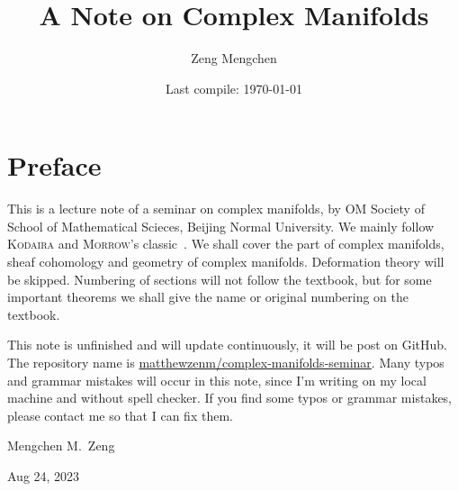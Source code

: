 \documentclass[a4paper]{book}
\title{A Note on Complex Manifolds}
\author{Zeng Mengchen}
\date{Last compile: \today}
\theoremstyle{definition}
\theoremstyle{plain}
\theoremstyle{remark}
\begin{document}
\maketitle
\thispagestyle{empty}

\frontmatter

\tableofcontents
\newpage
\thispagestyle{empty}

\chapter{Preface}

This is a lecture note of a seminar on complex manifolds, by OM Society of School of Mathematical Scieces, Beijing Normal University.
We mainly follow \textsc{Kodaira} and \textsc{Morrow}'s classic~\cite{Kodaira06}.
We shall cover the part of complex manifolds, sheaf cohomology and geometry of complex manifolds.
Deformation theory will be skipped.
Numbering of sections will not follow the textbook, but for some important theorems we shall give the name or original numbering on the textbook.

This note is unfinished and will update continuously, it will be post on GitHub.
The repository name is \href{https://github.com/matthewzenm/complex-manifolds-seminar}{matthewzenm/complex-manifolds-seminar}.
Many typos and grammar mistakes will occur in this note, since I'm writing on my local machine and without spell checker.
If you find some typos or grammar mistakes, please contact me so that I can fix them.

\begin{flushright}
    Mengchen M.\ Zeng

    Aug 24, 2023
\end{flushright}

\newpage
\thispagestyle{empty}

\mainmatter



\backmatter


\end{document}
